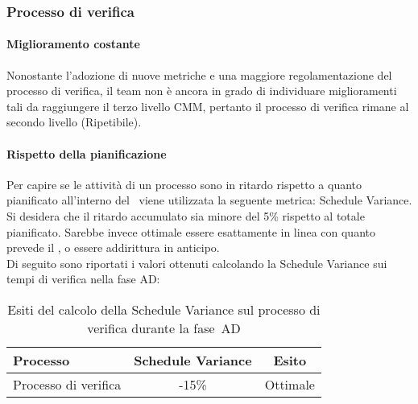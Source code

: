 \documentclass[../PianoDiQualifica.tex]{subfiles}
\begin{document}
\begin{appendices}
		\subsubsection{Processo di verifica}
			\paragraph{Miglioramento costante}
			Nonostante l'adozione di nuove metriche e una maggiore regolamentazione del processo di verifica, il team non è ancora in grado di individuare miglioramenti tali da raggiungere il terzo livello CMM, pertanto il processo di verifica rimane al secondo livello (Ripetibile).
			
			\paragraph{Rispetto della pianificazione}
			Per capire se le attività di un processo sono in ritardo rispetto a quanto pianificato all’interno del \pianodiprogetto\ viene utilizzata la seguente metrica: Schedule Variance.\\
			Si desidera che il ritardo accumulato sia minore del 5\% rispetto al totale pianificato. Sarebbe invece ottimale essere esattamente in linea con quanto prevede il \pianodiprogetto, o essere addirittura in anticipo.\\
			Di seguito sono riportati i valori ottenuti calcolando la Schedule Variance sui tempi di verifica nella fase AD:
			\begin{table}[H]
				\centering
				\begin{tabular}{l * {2}{c}}
					\toprule
					\textbf{Processo} & \textbf{Schedule Variance} & \textbf{Esito} \\
					\midrule
					Processo di verifica & -15\% &  Ottimale \\
					\bottomrule
				\end{tabular}
				\caption{Esiti del calcolo della Schedule Variance sul processo di verifica durante la fase\g\ AD}
				\label{tab:esiti_schedule_variance}
			\end{table}
			

\end{appendices}
\end{document}
